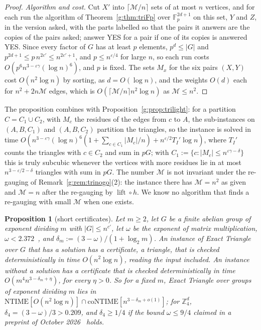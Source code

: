 \documentclass[11pt]{article}
\newtheorem{proposition}[theorem]{Proposition}
\theoremstyle{definition}
\theoremstyle{remark}
\newcommand{\Z}{\mathbb{Z}}
\newcommand{\Fp}{\mathbb{F}_p}
\newcommand{\eps}{\varepsilon}
\DeclareMathOperator{\lift}{lift}
\begin{document}
\begin{proof}
\emph{Algorithm and cost.} Cut $X'$ into $\lceil\mathcal M/n\rceil$ sets of at most $n$ vertices, and for each run the algorithm of Theorem~\ref{g:thm:triFp} over $\Fp^{2d+1}$ on this set, $Y$ and $Z$, in the version asked, with the parts labelled so that the pairs it answers are the copies of the pairs asked; answer YES for a pair if one of its copies is answered YES. Since every factor of $G$ has at least $p$ elements, $p^d\le|G|$ and $p^{2d+1}\le p\,n^{2c'}\le n^{2c'+1}$, and $p\le n^{\eps/4}$ for large $n$, so each run costs $O(p^6n^{3-\eps\gamma}(\log n)^6)$, and $p$ is fixed. The sets $M_x$ for the six pairs $(X,Y)$ cost $O(n^2\log n)$ by sorting, as $d=O(\log n)$, and the weights $O(d)$ each for $n^2+2n\mathcal M$ edges, which is $O(\lceil\mathcal M/n\rceil n^2\log n)$ as $\mathcal M\le n^2$.
\end{proof}

The proposition combines with Proposition~\ref{g:prop:trilight}: for a partition $C=C_1\cup C_2$, with $M_c$ the residues of the edges from $c$ to $A$, the sub-instances on $(A,B,C_1)$ and $(A,B,C_2)$ partition the triangles, so the instance is solved in time $O(n^{3-\eps\gamma}(\log n)^6(1+\sum_{c\in C_1}|M_c|/n)+n^{\eps/2}T_I'\log n)$, where $T_I'$ counts the triangles with $c\in C_2$ and sum in $pG$; with $C_1:=\{c:|M_c|\le n^{\eps\gamma-\delta}\}$ this is truly subcubic whenever the vertices with more residues lie in at most $n^{3-\eps/2-\delta}$ triangles with sum in $pG$. The number $\mathcal M$ is not invariant under the re-gauging of Remark~\ref{g:rem:trinogo}(2): the instance there has $\mathcal M=n^2$ as given and $\mathcal M=n$ after the re-gauging by $\lift\circ h$. We know no algorithm that finds a re-gauging with small $\mathcal M$ when one exists.

\begin{proposition}[short certificates]\label{g:prop:tricert}
Let $m\ge2$, let $G$ be a finite abelian group of exponent dividing $m$ with $|G|\le n^{c'}$, let $\omega$ be the exponent of matrix multiplication, $\omega<2.372$~\cite{VXXZ24}, and $\delta_m:=(3-\omega)/(1+\log_2m)$. An instance of Exact Triangle over $G$ that has a solution has a certificate, a triangle, that is checked deterministically in time $O(n^2\log n)$, reading the input included. An instance without a solution has a certificate that is checked deterministically in time $O(m^4n^{3-\delta_m+\eta})$, for every $\eta>0$. So for a fixed $m$, Exact Triangle over groups of exponent dividing $m$ lies in $\mathrm{NTIME}[O(n^2\log n)]\cap\mathrm{coNTIME}[n^{3-\delta_m+o(1)}]$; for $\Z_4^d$, $\delta_4=(3-\omega)/3>0.209$, and $\delta_4\ge1/4$ if the bound $\omega\le9/4$ claimed in a preprint of October 2026~\cite{OAI26} holds.
\end{proposition}
\end{document}
